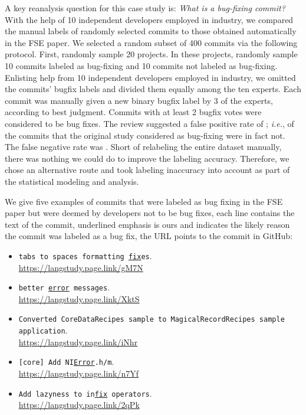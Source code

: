 \documentclass[acmsmall]{acmart}
\newcommand{\gh}{{GitHub}\xspace}
\newcommand{\ie}{\emph{i.e.}\xspace}
\begin{document}
A key reanalysis question for this case study is: {\it What is a bug-fixing
  commit?}  With the help of 10 independent developers employed in industry,
we compared the manual labels of randomly selected commits to those obtained
automatically in the FSE paper.  We selected a random subset of 400 commits
via the following protocol. First, randomly sample 20 projects. In these
projects, randomly sample 10 commits labeled as bug-fixing and 10 commits
not labeled as bug-fixing. Enlisting help from 10 independent developers
employed in industry, we omitted the commits' bugfix labels and divided them 
equally among the ten experts. Each commit was manually given a new binary 
bugfix label by 3 of the experts, according to best judgment. Commits
with at least 2 bugfix votes were considered to be bug fixes.  The review
suggested a false positive rate of \commitsFalsePositives; \ie, \commitsFalsePositives of the commits that the
original study considered as bug-fixing were in fact not. The false negative
rate was \commitsFalseNegatives.  Short of relabeling the entire dataset manually, there was
nothing we could do to improve the labeling accuracy. Therefore, we chose an
alternative route and took labeling inaccuracy into account as part of the
statistical modeling and analysis.

We give five examples of commits that were labeled as bug fixing in the FSE
paper but were deemed by developers not to be bug fixes, each line contains
the text of the commit, underlined emphasis is ours and indicates the likely
reason the commit was labeled as a bug fix, the URL points to the commit in
\gh:
\begin{itemize}
\item {\tt tabs to spaces formatting \underline{fix}es}.\\ {\small\sf\url{https://langstudy.page.link/gM7N}} 
\item {\tt better \underline{error} messages}.\\ {\small\sf \url{https://langstudy.page.link/XktS}}
\item {\tt Converted   CoreDataRecipes sample to MagicalRecordRecipes sample application}.\\
 {\small\sf \url{https://langstudy.page.link/iNhr}}
\item {\tt [core] Add  NI\underline{Error}.h/m}.\\{\small\sf\url{https://langstudy.page.link/n7Yf}}
\item {\tt Add lazyness to in\underline{fix} operators}.\\{\small\sf\url{https://langstudy.page.link/2qPk}}
\end{itemize}
\end{document}
